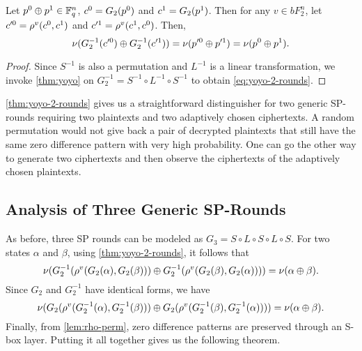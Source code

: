 \documentclass[twoside]{article}
\begin{document}
\begin{theorem}
    \label{thm:yoyo-2-rounds}
    Let \(p^0 \oplus p^1 \in \mathbb F_q^n\), \(c^0 = G_2(p^0)\) and \(c^1 =
    G_2(p^1)\). Then for any \(v \in bF_2^n\), let \(c^{\prime 0} =
    \rho^v(c^0, c^1)\) and \(c^{\prime 1} = \rho^v(c^1, c^0)\). Then,
    \begin{equation}
        \nu(G_2^{-1}(c^{\prime 0}) \oplus G_2^{-1}(c^{\prime 1})) = \nu(p^{\prime 0} \oplus p^{\prime 1}) = \nu(p^0 \oplus p^1).
        \label{eq:yoyo-2-rounds}
    \end{equation}
\end{theorem}
\begin{proof}
    Since \(S^{-1}\) is also a permutation and \(L^{-1}\) is a linear
    transformation, we invoke \autoref{thm:yoyo} on \(G_2^{-1} = S^{-1} \circ
    L^{-1} \circ S^{-1}\) to obtain \eqref{eq:yoyo-2-rounds}.
\end{proof}

\autoref{thm:yoyo-2-rounds} gives us a straightforward distinguisher for two
generic SP-rounds requiring two plaintexts and two adaptively chosen
ciphertexts. A random permutation would not give back a pair of decrypted
plaintexts that still have the same zero difference pattern with very high
probability. One can go the other way to generate two ciphertexts and then
observe the ciphertexts of the adaptively chosen plaintexts.

\subsection{Analysis of Three Generic SP-Rounds}

As before, three SP rounds can be modeled as \(G_3 = S \circ L \circ S \circ L
\circ S\). For two states \(\alpha\) and \(\beta\), using
\autoref{thm:yoyo-2-rounds}, it follows that
\begin{equation}
    \nu(G_2^{-1}(\rho^v(G_2(\alpha), G_2(\beta))) \oplus G_2^{-1}(\rho^v(G_2(\beta), G_2(\alpha)))) = \nu(\alpha \oplus \beta).
\end{equation}
Since \(G_2\) and \(G_2^{-1}\) have identical forms, we have
\begin{equation}
    \nu(G_2(\rho^v(G_2^{-1}(\alpha), G_2^{-1}(\beta))) \oplus G_2(\rho^v(G_2^{-1}(\beta), G_2^{-1}(\alpha)))) = \nu(\alpha \oplus \beta).
\end{equation}
Finally, from \autoref{lem:rho-perm}, zero difference patterns are preserved
through an S-box layer. Putting it all together gives us the following theorem.
\end{document}
